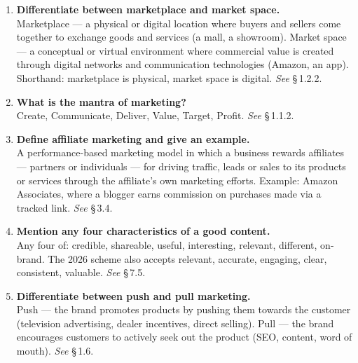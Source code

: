 \documentclass{MMTextbook}
\begin{document}
\begin{enumerate}[leftmargin=2.2em,itemsep=1.1ex]

\item \textbf{Differentiate between marketplace and market space.}
      \\
      Marketplace --- a physical or digital location where buyers and sellers
      come together to exchange goods and services (a mall, a showroom). Market
      space --- a conceptual or virtual environment where commercial value is
      created through digital networks and communication technologies (Amazon,
      an app). Shorthand: marketplace is physical, market space is digital.
      \hfill\emph{See} \S\,1.2.2.

\item \textbf{What is the mantra of marketing?}
      \\
      Create, Communicate, Deliver, Value, Target, Profit.
      \hfill\emph{See} \S\,1.1.2.

\item \textbf{Define affiliate marketing and give an example.}
      \\
      A performance-based marketing model in which a business rewards
      affiliates --- partners or individuals --- for driving traffic, leads or
      sales to its products or services through the affiliate's own marketing
      efforts. Example: Amazon Associates, where a blogger earns commission on
      purchases made via a tracked link. \hfill\emph{See} \S\,3.4.

\item \textbf{Mention any four characteristics of a good content.}
      \\
      Any four of: credible, shareable, useful, interesting, relevant,
      different, on-brand. The 2026 scheme also accepts relevant, accurate,
      engaging, clear, consistent, valuable. \hfill\emph{See} \S\,7.5.

\item \textbf{Differentiate between push and pull marketing.}
      \\
      Push --- the brand promotes products by pushing them towards the customer
      (television advertising, dealer incentives, direct selling). Pull --- the
      brand encourages customers to actively seek out the product (SEO, content,
      word of mouth). \hfill\emph{See} \S\,1.6.


\end{enumerate}
\end{document}
